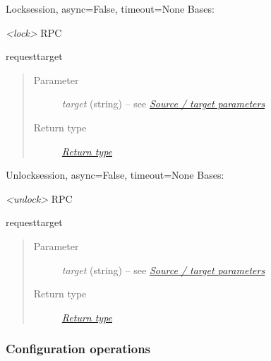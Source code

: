 \documentclass[a4paper,10pt,english]{manual}
\begin{document}
\hypertarget{ncclient.operations.Lock}{}\begin{classdesc}{Lock}{session, async=False, timeout=None}
Bases: \hyperlink{ncclient.operations.rpc.RPC}{}

\emph{\textless{}lock\textgreater{}} RPC

\hypertarget{ncclient.operations.Lock.request}{}\begin{methoddesc}{request}{target}~\begin{quote}\begin{description}
\item[Parameter]
\emph{target} (string) -- see \hyperlink{source-target}{\emph{Source / target parameters}}

\item[Return type]
\hyperlink{return}{\emph{Return type}}

\end{description}\end{quote}
\end{methoddesc}
\end{classdesc}

\hypertarget{ncclient.operations.Unlock}{}\begin{classdesc}{Unlock}{session, async=False, timeout=None}
Bases: \hyperlink{ncclient.operations.rpc.RPC}{}

\emph{\textless{}unlock\textgreater{}} RPC

\hypertarget{ncclient.operations.Unlock.request}{}\begin{methoddesc}{request}{target}~\begin{quote}\begin{description}
\item[Parameter]
\emph{target} (string) -- see \hyperlink{source-target}{\emph{Source / target parameters}}

\item[Return type]
\hyperlink{return}{\emph{Return type}}

\end{description}\end{quote}
\end{methoddesc}
\end{classdesc}


\subsubsection{Configuration operations}
\end{document}
